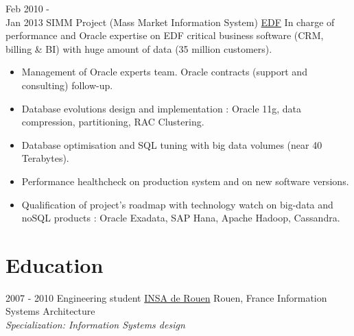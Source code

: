 \documentclass[letterpaper]{twentysecondcv} %
\begin{document}
\begin{twenty}
    \twentyitem
   	{Feb 2010 - \\ Jan 2013}
        {SIMM Project (Mass Market Information System)}
        {\href{http://www.edf.fr/}{EDF}}
        {In charge of performance and Oracle expertise on EDF critical business software (CRM, billing \& BI) with huge amount of data (35 million customers).}
        {
        {\begin{itemize}
        \item Management of Oracle experts team. Oracle contracts (support and consulting) follow-up.
        \item Database evolutions design and implementation : Oracle 11g, data compression, partitioning, RAC Clustering.
        \item Database optimisation and SQL tuning with big data volumes (near 40 Terabytes).
        \item Performance healthcheck on production system and on new software versions. 
        \item Qualification of project’s roadmap with technology watch on big-data and noSQL products : Oracle Exadata, SAP Hana, Apache Hadoop, Cassandra.
    \end{itemize}}
        }
        
        
\end{twenty}

\section{Education}

\begin{twenty} %
	\twentyitem
    	{2007 - 2010}
        {Engineering student}
        {\href{http://http://www.insa-rouen.fr/}{INSA de Rouen}}
        {Rouen, France}
        {Information Systems Architecture \\ \textit{Specialization: Information Systems design}}
\end{twenty}
\end{document}
